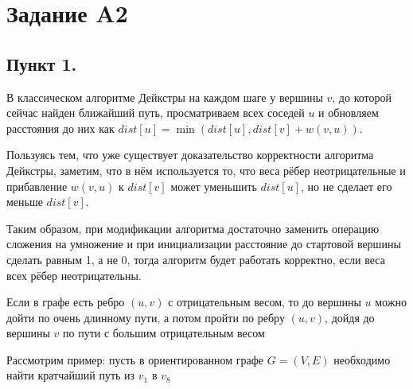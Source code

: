 \documentclass{report}
\begin{document}
\chapter*{Задание A2}

\section*{Пункт 1.}

\raggedright
В классическом алгоритме Дейкстры на каждом шаге у вершины $v$, до которой сейчас найден ближайший путь, просматриваем
всех соседей $u$ и обновляем расстояния до них как $dist[u] = \min(dist[u], dist[v] + w(v, u))$.

Пользуясь тем, что уже существует доказательство корректности алгоритма Дейкстры, заметим, что в нём используется то,
что веса рёбер неотрицательные и прибавление $w(v, u)$ к $dist[v]$ может уменьшить $dist[u]$, но не сделает его меньше $dist[v]$.

Таким образом, при модификации алгоритма достаточно заменить операцию сложения на умножение и при инициализации расстояние
до стартовой вершины сделать равным 1, а не 0, тогда алгоритм будет работать корректно, если веса всех рёбер неотрицательны.

Если в графе есть ребро $(u, v)$ с отрицательным весом, то до вершины $u$ можно дойти по очень длинному пути, а потом пройти по ребру $(u, v)$,
дойдя до вершины $v$ по пути с большим отрицательным весом
\par

Рассмотрим пример: пусть в ориентированном графе $G = (V, E)$ необходимо найти кратчайший путь из $v_1$ в $v_8$
\end{document}
